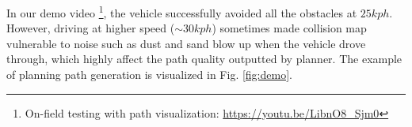 \documentclass[../thesis.tex]{subfiles}
\begin{document}
In our demo video \footnote{On-field testing with path visualization: \url{https://youtu.be/LibnO8_Sjm0}}, the vehicle successfully avoided all the obstacles at $25 kph$. However, driving at higher speed ($\sim 30kph$) sometimes made collision map vulnerable to noise such as dust and sand blow up when the vehicle drove through, which highly affect the path quality outputted by planner. The example of planning path generation is visualized in Fig. \ref{fig:demo}.

 


\end{document}
